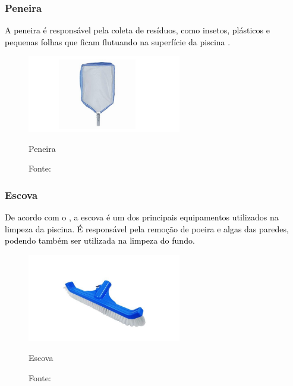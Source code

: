         \subsubsection*{Peneira}

         \textcolor{black}{A peneira é responsável pela coleta de resíduos, como insetos, plásticos e pequenas folhas que ficam flutuando na superfície da piscina \cite{benedito2024projeto}.}

            \begin{figure}[H]
                \centering
                \caption{ }  
                \centering
                \label{fig:cont}
                \includegraphics[width=0.60\textwidth]{imagens/peneira.png}
                \caption*{Peneira}
                \caption*{Fonte: \cite{benedito2024projeto}}
            \end{figure}

        \subsubsection*{Escova}

         \textcolor{black}{De acordo com o \cite{benedito2024projeto}, a escova é um dos principais equipamentos utilizados na limpeza da piscina. É responsável pela remoção de poeira e algas das paredes, podendo também ser utilizada na limpeza do fundo.}

            \begin{figure}[H]
                \centering
                \caption{ }  
                \centering
                \label{fig:cont}
                \includegraphics[width=0.60\textwidth]{imagens/escova.png}
                \caption*{Escova}
                \caption*{Fonte: \cite{benedito2024projeto}}
            \end{figure}

